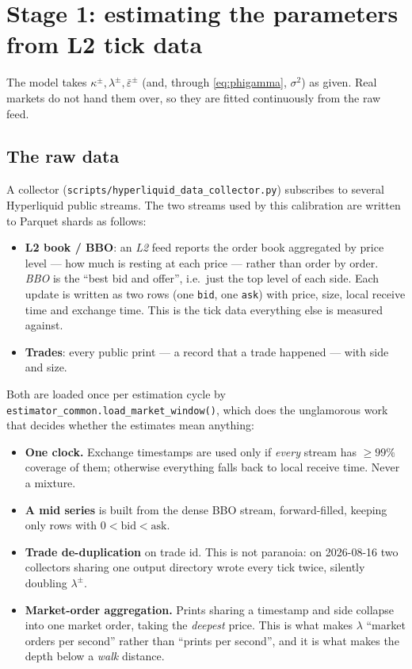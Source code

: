 \documentclass[11pt,a4paper]{article}
\newcommand{\epsb}{\bar{\varepsilon}}
\newcommand{\code}[1]{\texttt{\small #1}}
\begin{document}
\section{Stage 1: estimating the parameters from L2 tick data}
\label{sec:estimation}

The model takes $\kappa^{\pm}, \lambda^{\pm}, \epsb^{\pm}$ (and, through
\eqref{eq:phigamma}, $\sigma^2$) as given. Real markets do not hand them over,
so they are fitted continuously from the raw feed.

\subsection{The raw data}

A collector (\code{scripts/hyperliquid\_data\_collector.py}) subscribes to
several Hyperliquid public streams. The two streams used by this calibration are
written to Parquet shards as follows:

\begin{itemize}[nosep]
  \item \textbf{L2 book / BBO}: an \emph{L2} feed reports the order book
    aggregated by price level --- how much is resting at each price --- rather
    than order by order. \emph{BBO} is the ``best bid and offer'', i.e.\ just the
    top level of each side. Each update is written as two rows (one \code{bid},
    one \code{ask}) with price, size, local receive time and exchange time. This
    is the tick data everything else is measured against.
  \item \textbf{Trades}: every public print --- a record that a trade happened
    --- with side and size.
\end{itemize}

Both are loaded once per estimation cycle by
\code{estimator\_common.load\_market\_window()}, which does the unglamorous work
that decides whether the estimates mean anything:

\begin{itemize}[nosep]
  \item \textbf{One clock.} Exchange timestamps are used only if \emph{every}
    stream has $\ge99\%$ coverage of them; otherwise everything falls back to
    local receive time. Never a mixture.
  \item \textbf{A mid series} is built from the dense BBO stream, forward-filled,
    keeping only rows with $0 < \text{bid} < \text{ask}$.
  \item \textbf{Trade de-duplication} on trade id. This is not paranoia: on
    2026-08-16 two collectors sharing one output directory wrote every tick
    twice, silently doubling $\lambda^{\pm}$.
  \item \textbf{Market-order aggregation.} Prints sharing a timestamp and side
    collapse into one market order, taking the \emph{deepest} price. This is what
    makes $\lambda$ ``market orders per second'' rather than ``prints per
    second'', and it is what makes the depth below a \emph{walk} distance.
\end{itemize}
\end{document}
